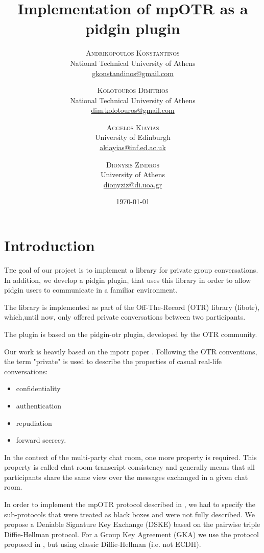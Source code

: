 \documentclass[]{article}
\title{Implementation of mpOTR as a pidgin plugin} %
\author{%
\textsc{Andrikopoulos Konstantinos}\\[1ex] %
\normalsize National Technical University of Athens \\ %
\normalsize \href{mailto:gkonstandinos@gmail.com}{gkonstandinos@gmail.com} %
\and %
\textsc{Kolotouros Dimitrios} \\[1ex] %
\normalsize National Technical University of Athens \\ %
\normalsize \href{dim.kolotouros@gmail.com}{dim.kolotouros@gmail.com}  %
\and %
\textsc{Aggelos Kiayias} \\[1ex] %
\normalsize University of Edinburgh \\ %
\normalsize \href{mailto:akiayias@inf.ed.ac.uk}{akiayias@inf.ed.ac.uk} \\[1ex]%
\and%
\textsc{Dionysis Zindros} \\[1ex] %
\normalsize University of Athens \\ %
\normalsize \href{mailto:dionyziz@di.uoa.gr}{dionyziz@di.uoa.gr} %
}
\date{\today} %
\begin{document}
\maketitle


\section{Introduction}

\lettrine[nindent=0em,lines=3]{T}he goal of our project is to implement a library for private group conversations.
In addition, we develop a pidgin plugin, that uses this library in order to allow pidgin users to communicate in a familiar environment.

The library is implemented as part of the Off-The-Record (OTR) library (libotr), which,until now, only offered private conversations between two participants.

The plugin is based on the pidgin-otr plugin, developed by the OTR community.

Our work is heavily based on the mpotr paper \cite{mpotr}.
Following the OTR conventions, the term "private" is used to describe the properties of casual real-life conversations:

\begin{itemize}
  \item confidentiality
  \item authentication
  \item repudiation
  \item forward secrecy.
\end{itemize}

In the context of the multi-party chat room, one more property is required.
This property is called chat room transcript consistency and generally means that all participants share the same view over the messages  exchanged in a given chat room.

In order to implement the mpOTR protocol described in \cite{mpotr}, we had to specify the sub-protocols that were treated as black boxes and were not fully described.
We propose a Deniable Signature Key Exchange (DSKE) based on the pairwise triple Diffie-Hellman protocol.
For a Group Key Agreement (GKA) we use the protocol proposed in \cite{mpenc}, but using classic Diffie-Hellman (i.e. not ECDH).
\end{document}
